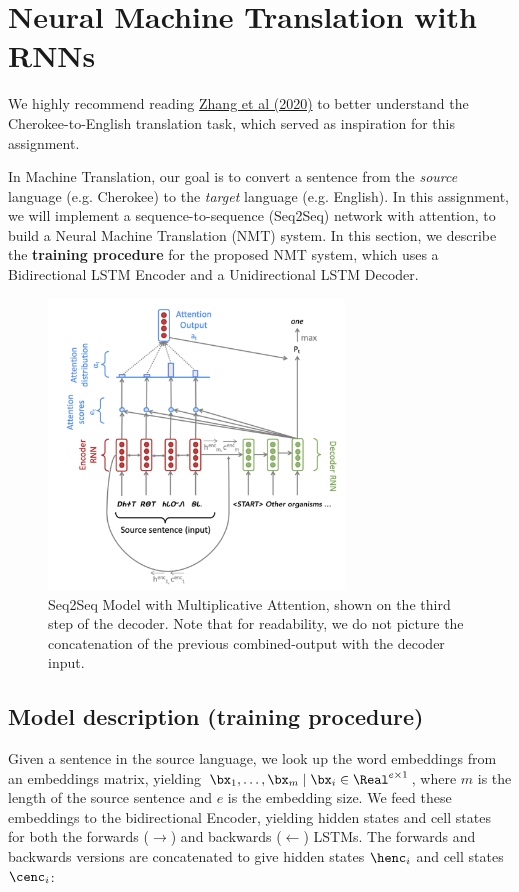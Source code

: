 \section{Neural Machine Translation with RNNs}
We highly recommend reading \href{https://arxiv.org/abs/2010.04791}{Zhang et al (2020)} to better understand the Cherokee-to-English translation task, which served as inspiration for this assignment.
\newline

In Machine Translation, our goal is to convert a sentence from the \textit{source} language (e.g. Cherokee) to the \textit{target} language (e.g. English). In this assignment, we will implement a sequence-to-sequence (Seq2Seq) network with attention, to build a Neural Machine Translation (NMT) system. In this section, we describe the \textbf{training procedure} for the proposed NMT system, which uses a Bidirectional LSTM Encoder and a Unidirectional LSTM Decoder.
\newline

\begin{figure}[h]
    \begin{center}
        \captionsetup{width=0.8\textwidth}
        \includegraphics[width=0.7\textwidth]{images/nmt.png}
        \caption{Seq2Seq Model with Multiplicative Attention, shown on the third step of the decoder. Note that for readability, we do not picture the concatenation of the previous combined-output with the decoder input.}
        \label{nmt-figure}
    \end{center}
\end{figure}

\subsection*{Model description (training procedure)}
Given a sentence in the source language, we look up the word embeddings from an embeddings matrix, yielding $\bx_1, \dots, \bx_m \mid \bx_i \in \Real^{e \times 1}$, where $m$ is the length of the source sentence and $e$ is the embedding size. We feed these embeddings to the bidirectional Encoder, yielding hidden states and cell states for both the forwards ($\rightarrow$) and backwards ($\leftarrow$) LSTMs. The forwards and backwards versions are concatenated to give hidden states $\henc_i$ and cell states $\cenc_i$:
 
